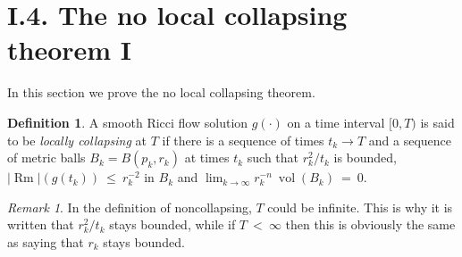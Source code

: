 \documentclass[12pt]{amsart}
\newcommand{\Rm}{\operatorname{Rm}}
\newcommand{\vol}{\operatorname{vol}}
\numberwithin{equation}{section}
\theoremstyle{plain}
\theoremstyle{definition}
\newtheorem{definition}[equation]{Definition}
\theoremstyle{remark}
\newtheorem{remark}[equation]{Remark}
\begin{document}
\section{I.4. The no local collapsing theorem I}

In this section we prove the no local collapsing theorem.

\begin{definition}
A smooth Ricci flow solution $g(\cdot)$ on a time interval
$[0, T)$ is said to be {\em locally collapsing} at $T$ if there
is a sequence of times $t_k \rightarrow T$ and a sequence 
of metric balls $B_k = B(p_k, r_k)$ at times $t_k$ such that
$r_k^2/t_k$ is bounded, $|\Rm|(g(t_k)) \: \le \: r_k^{-2}$
in $B_k$ and $\lim_{k \rightarrow \infty}
r_k^{-n} \: \vol(B_k) \: = \: 0$.
\end{definition}

\begin{remark}
In the definition of noncollapsing, $T$ could be infinite.
This is why it is written that $r_k^2/t_k$ stays bounded, while
if $T \: < \: \infty$ then this is obviously the same as saying that
$r_k$ stays bounded.
\end{remark}
\end{document}
